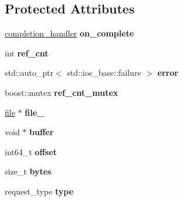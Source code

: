 \subsection*{Protected Attributes}
\begin{CompactItemize}
\item 
\hypertarget{group__iolayer_g2d9258e3443b499e4c641c2843bdc7a1}{
\hyperlink{classcompletion__handler}{completion\_\-handler} \textbf{on\_\-complete}}
\label{group__iolayer_g2d9258e3443b499e4c641c2843bdc7a1}

\item 
\hypertarget{group__iolayer_gbc00c1450db214bd32b3936d95730401}{
int \textbf{ref\_\-cnt}}
\label{group__iolayer_gbc00c1450db214bd32b3936d95730401}

\item 
\hypertarget{group__iolayer_g8f916a380f56a5017fdb196f76feaf31}{
std::auto\_\-ptr$<$ std::ios\_\-base::failure $>$ \textbf{error}}
\label{group__iolayer_g8f916a380f56a5017fdb196f76feaf31}

\item 
\hypertarget{group__iolayer_g341cdc5f009668b88edc9415720c6bc0}{
boost::mutex \textbf{ref\_\-cnt\_\-mutex}}
\label{group__iolayer_g341cdc5f009668b88edc9415720c6bc0}

\item 
\hypertarget{group__iolayer_gf25e69a9ec49b9aeb592ff28b9a1697e}{
\hyperlink{classfile}{file} $\ast$ \textbf{file\_\-}}
\label{group__iolayer_gf25e69a9ec49b9aeb592ff28b9a1697e}

\item 
\hypertarget{group__iolayer_g073eb2eba36110cc4362765aba803cdd}{
void $\ast$ \textbf{buffer}}
\label{group__iolayer_g073eb2eba36110cc4362765aba803cdd}

\item 
\hypertarget{group__iolayer_gbfc7b5f60fb16d3551e21fbba49d75dc}{
int64\_\-t \textbf{offset}}
\label{group__iolayer_gbfc7b5f60fb16d3551e21fbba49d75dc}

\item 
\hypertarget{group__iolayer_gffe23f8f72bfd5e016c3c7125740f96b}{
size\_\-t \textbf{bytes}}
\label{group__iolayer_gffe23f8f72bfd5e016c3c7125740f96b}

\item 
\hypertarget{group__iolayer_gcc85c654247d6d16afb0b1d63a7d3c8e}{
request\_\-type \textbf{type}}
\label{group__iolayer_gcc85c654247d6d16afb0b1d63a7d3c8e}

\end{CompactItemize}
